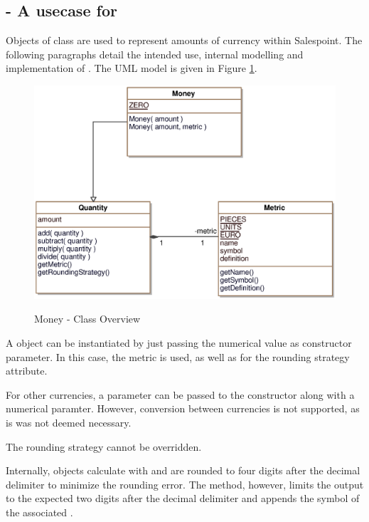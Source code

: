 \subsection{ - A usecase for }
Objects of class  are used to represent amounts of currency within Salespoint.
The following paragraphs detail the intended use, internal modelling and implementation of .
The UML model is given in Figure \ref{money_overview}.

\begin{figure}[ht]
	\centering
  \includegraphics[width=1.0\textwidth]{images/Money_Overview.eps}
	\label{money_overview}
	\caption{Money - Class Overview}
\end{figure}

A  object can be instantiated by just passing the numerical value as constructor parameter.
In this case, the metric  is used, as well as  for the rounding strategy attribute.

For other currencies, a  parameter can be passed to the constructor along with a numerical paramter.
However, conversion between currencies is not supported, as is was not deemed necessary.

The rounding strategy cannot be overridden.

Internally,  objects calculate with and are rounded to four digits after the decimal delimiter to minimize the rounding error.
The  method, however, limits the output to the expected two digits after the decimal delimiter and appends the symbol of the associated .

